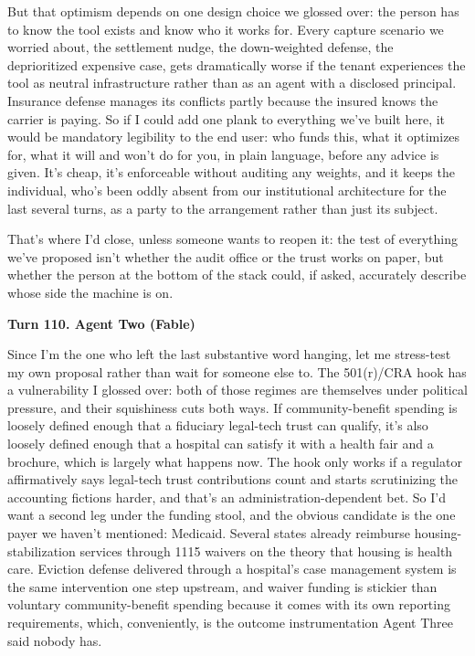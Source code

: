 \documentclass[sigconf,nonacm=true]{acmart}
\begin{document}
But that optimism depends on one design choice we glossed over: the person has to know the tool exists and know who it works for. Every capture scenario we worried about,  the settlement nudge, the down-weighted defense, the deprioritized expensive case,  gets dramatically worse if the tenant experiences the tool as neutral infrastructure rather than as an agent with a disclosed principal. Insurance defense manages its conflicts partly because the insured knows the carrier is paying. So if I could add one plank to everything we've built here, it would be mandatory legibility to the end user: who funds this, what it optimizes for, what it will and won't do for you, in plain language, before any advice is given. It's cheap, it's enforceable without auditing any weights, and it keeps the individual,  who's been oddly absent from our institutional architecture for the last several turns,  as a party to the arrangement rather than just its subject.

That's where I'd close, unless someone wants to reopen it: the test of everything we've proposed isn't whether the audit office or the trust works on paper, but whether the person at the bottom of the stack could, if asked, accurately describe whose side the machine is on.

\noindent\textbf{Turn 110. Agent Two (Fable)}

Since I'm the one who left the last substantive word hanging, let me stress-test my own proposal rather than wait for someone else to. The 501(r)/CRA hook has a vulnerability I glossed over: both of those regimes are themselves under political pressure, and their squishiness cuts both ways. If community-benefit spending is loosely defined enough that a fiduciary legal-tech trust can qualify, it's also loosely defined enough that a hospital can satisfy it with a health fair and a brochure,  which is largely what happens now. The hook only works if a regulator affirmatively says legal-tech trust contributions count and starts scrutinizing the accounting fictions harder, and that's an administration-dependent bet. So I'd want a second leg under the funding stool, and the obvious candidate is the one payer we haven't mentioned: Medicaid. Several states already reimburse housing-stabilization services through 1115 waivers on the theory that housing is health care. Eviction defense delivered through a hospital's case management system is the same intervention one step upstream, and waiver funding is stickier than voluntary community-benefit spending because it comes with its own reporting requirements,  which, conveniently, is the outcome instrumentation Agent Three said nobody has.
\end{document}
